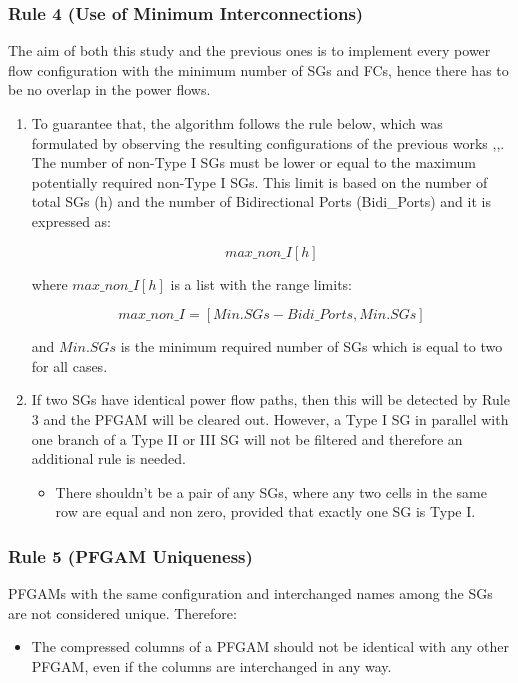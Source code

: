 \documentclass[conference]{IEEEtran}
\begin{document}
\subsubsection{Rule 4 (Use of Minimum Interconnections)}
The aim of both this study and the previous ones is to implement every power flow configuration with the minimum number of SGs and FCs, hence there has to be no overlap in the power flows. 
\begin{enumerate}[label=\Alph*)]\item To guarantee that, the algorithm follows the rule below, which was formulated by observing the resulting configurations of the previous works \cite{yang_synthesis_2015},\cite{zogogianni_non-isolated_2019},\cite{aljarajreh_synthesis_2021}.\\
The number of non-Type I SGs must be lower or equal to the maximum potentially required non-Type I SGs. This limit is based on the number of total SGs (h) and the number of Bidirectional Ports (Bidi\_Ports) and it is expressed as:
    \begin{small}
    \begin{equation}
    max\_non\_I[h]\end{equation}\end{small}
    where $max\_non\_I[h]$ is a list with the range limits:
    \begin{small}\begin{equation}max\_non\_I=[Min.SGs-Bidi\_Ports, Min.SGs]\end{equation}\end{small}
    and $Min.SGs$ is the minimum required number of SGs which is equal to two for all cases.
\item If two SGs have identical power flow paths, then this will be detected by Rule 3 and the PFGAM will be cleared out. However, a Type I SG in parallel with one branch of a Type II or III SG will not be filtered and therefore an additional rule is needed.
\begin{itemize}
    \item There shouldn't be a pair of any SGs, where any two cells in the same row are equal and non zero, provided that exactly one SG is Type I.
\end{itemize}\end{enumerate}

\subsubsection{Rule 5 (PFGAM Uniqueness)}
PFGAMs with the same configuration and interchanged names among the SGs are not considered unique. Therefore:
\begin{itemize}
    \item The compressed columns of a PFGAM should not be identical with any other PFGAM, even if the columns are interchanged in any way.
\end{itemize}
\end{document}

